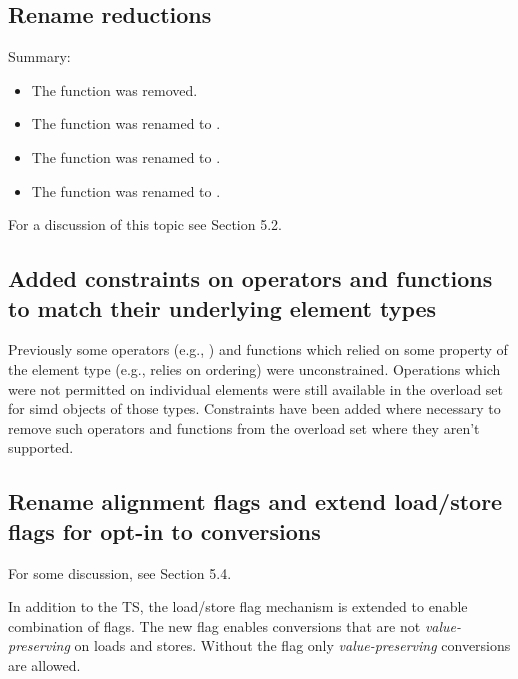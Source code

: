 \subsection{Rename  reductions}
Summary:
\begin{itemize}
  \item The function \stdx{} was removed.
  \item The function \stdx{} was renamed to \std{}.
  \item The function \stdx{} was renamed to \std{}.
  \item The function \stdx{} was renamed to \std{}.
\end{itemize}

For a discussion of this topic see  Section 5.2.

\subsection{Added constraints on operators and functions to match their underlying element types}

Previously some operators (e.g., ) and functions which relied on
some property of the element type (e.g.,  relies on ordering)
were unconstrained. Operations which were not permitted on individual elements
were still available in the overload set for simd objects of those types.
Constraints have been added where necessary to remove such operators and
functions from the overload set where they aren't supported.


\subsection{Rename alignment flags and extend load/store flags for opt-in to conversions}\label{sec:renameandextendflags}

For some discussion, see  Section 5.4.

In addition to the TS, the load/store flag mechanism is extended to enable combination of flags.
The new flag enables conversions that are not \emph{value-preserving} on loads and stores.
Without the flag only \emph{value-preserving} conversions are allowed.

